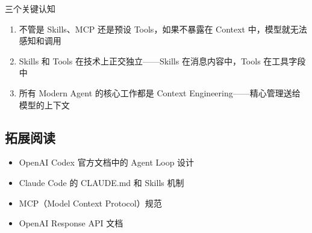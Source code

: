 \documentclass[a4paper]{article}
\begin{document}
\begin{importantbox}{三个关键认知}
\begin{enumerate}
    \item 不管是 Skills、MCP 还是预设 Tools，如果不暴露在 Context 中，模型就无法感知和调用
    \item Skills 和 Tools 在技术上正交独立——Skills 在消息内容中，Tools 在工具字段中
    \item 所有 Modern Agent 的核心工作都是 Context Engineering——精心管理送给模型的上下文
\end{enumerate}
\end{importantbox}

\subsection{拓展阅读}

\begin{itemize}
    \item OpenAI Codex 官方文档中的 Agent Loop 设计
    \item Claude Code 的 CLAUDE.md 和 Skills 机制
    \item MCP（Model Context Protocol）规范
    \item OpenAI Response API 文档
\end{itemize}

\end{document}
